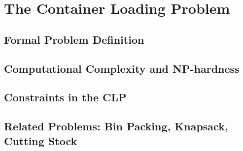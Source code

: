 \chapter{The Container Loading Problem}
\section{Formal Problem Definition}
\section{Computational Complexity and NP-hardness}
\section{Constraints in the CLP}
\section{Related Problems: Bin Packing, Knapsack, Cutting Stock}
